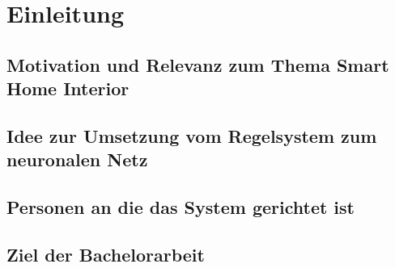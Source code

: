 \chapter{Einleitung}
\label{cha:Einleitung}

\section{Motivation und Relevanz zum Thema Smart Home Interior}

\section{Idee zur Umsetzung vom Regelsystem zum neuronalen Netz}

\section{Personen an die das System gerichtet ist}

\section{Ziel der Bachelorarbeit}